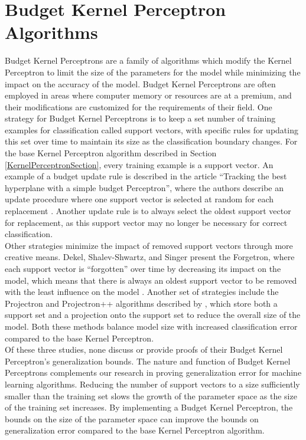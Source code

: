 \section{Budget Kernel Perceptron Algorithms}\label{BudgetKernelPerceptronSection}
Budget Kernel Perceptrons are a family of algorithms which modify the Kernel Perceptron to limit the size of the parameters for the model while minimizing the impact on the accuracy of the model. Budget Kernel Perceptrons are often employed in areas where computer memory or resources are at a premium, and their modifications are customized for the requirements of their field. One strategy for Budget Kernel Perceptrons is to keep a set number of training examples for classification called support vectors, with specific rules for updating this set over time to maintain its size as the classification boundary changes. For the base Kernel Perceptron algorithm described in Section \ref{KernelPerceptronSection}, every training example is a support vector. An example of a budget update rule is described in the article ``Tracking the best hyperplane with a simple budget Perceptron'', where the authors describe an update procedure where one support vector is selected at random for each replacement \cite{CCBG07}. Another update rule is to always select the oldest support vector for replacement, as this support vector may no longer be necessary for correct classification. 
\\Other strategies minimize the impact of removed support vectors through more creative means. Dekel, Shalev-Shwartz, and Singer present the Forgetron, where each support vector is ``forgotten'' over time by decreasing its impact on the model, which means that there is always an oldest support vector to be removed with the least influence on the model \cite{DSSS07}. Another set of strategies include the Projectron and Projectron++ algorithms described by \cite{OKC09}, which store both a support set and a projection onto the support set to reduce the overall size of the model. Both these methods balance model size with increased classification error compared to the base Kernel Perceptron.
\\Of these three studies, none discuss or provide proofs of their Budget Kernel Perceptron's generalization bounds. The nature and function of Budget Kernel Perceptrons complements our research in proving generalization error for machine learning algorithms. Reducing the number of support vectors to a size sufficiently smaller than the training set slows the growth of the parameter space as the size of the training set increases. By implementing a Budget Kernel Perceptron, the bounds on the size of the parameter space can improve the bounds on generalization error compared to the base Kernel Perceptron algorithm.
